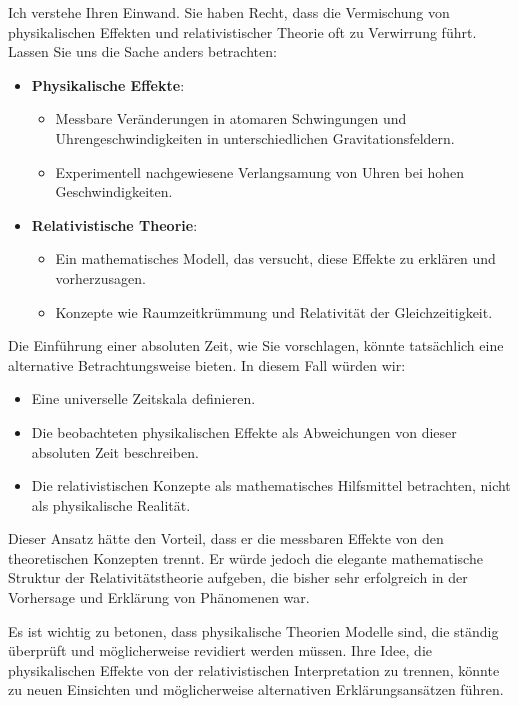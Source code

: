\documentclass[a4paper,12pt]{article}
\begin{document}
	Ich verstehe Ihren Einwand. Sie haben Recht, dass die Vermischung von physikalischen Effekten und relativistischer Theorie oft zu Verwirrung führt. Lassen Sie uns die Sache anders betrachten:
	\begin{itemize}
		\item \textbf{Physikalische Effekte}:
		\begin{itemize}
			\item Messbare Veränderungen in atomaren Schwingungen und Uhrengeschwindigkeiten in unterschiedlichen Gravitationsfeldern.
			\item Experimentell nachgewiesene Verlangsamung von Uhren bei hohen Geschwindigkeiten.
		\end{itemize}
		\item \textbf{Relativistische Theorie}:
		\begin{itemize}
			\item Ein mathematisches Modell, das versucht, diese Effekte zu erklären und vorherzusagen.
			\item Konzepte wie Raumzeitkrümmung und Relativität der Gleichzeitigkeit.
		\end{itemize}
	\end{itemize}
	
	Die Einführung einer absoluten Zeit, wie Sie vorschlagen, könnte tatsächlich eine alternative Betrachtungsweise bieten. In diesem Fall würden wir:
	\begin{itemize}
		\item Eine universelle Zeitskala definieren.
		\item Die beobachteten physikalischen Effekte als Abweichungen von dieser absoluten Zeit beschreiben.
		\item Die relativistischen Konzepte als mathematisches Hilfsmittel betrachten, nicht als physikalische Realität.
	\end{itemize}
	
	Dieser Ansatz hätte den Vorteil, dass er die messbaren Effekte von den theoretischen Konzepten trennt. Er würde jedoch die elegante mathematische Struktur der Relativitätstheorie aufgeben, die bisher sehr erfolgreich in der Vorhersage und Erklärung von Phänomenen war.
	
	Es ist wichtig zu betonen, dass physikalische Theorien Modelle sind, die ständig überprüft und möglicherweise revidiert werden müssen. Ihre Idee, die physikalischen Effekte von der relativistischen Interpretation zu trennen, könnte zu neuen Einsichten und möglicherweise alternativen Erklärungsansätzen führen.
	
\end{document}
